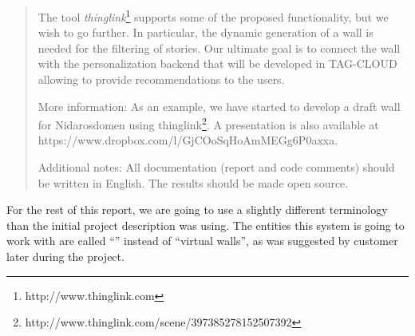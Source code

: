 \documentclass[11pt]{book}
\begin{document}
\begin{quotation}
The tool \emph{thinglink}\footnote{http://www.thinglink.com} supports some of the proposed functionality, but we wish to go further. In particular, the dynamic generation of a wall is needed for the filtering of stories. Our ultimate goal is to connect the wall with the personalization backend that will be developed in TAG-CLOUD allowing to provide recommendations to the users.

More information: As an example, we have started to develop a draft wall for Nidarosdomen using thinglink\footnote{http://www.thinglink.com/scene/397385278152507392}. A presentation is also available at https://www.dropbox.com/l/GjCOoSqHoAmMEGg6P0axxa.

Additional notes: All documentation (report and code comments) should be written in English. The results should be made open source.\cite[p. 47]{compendium}
\end{quotation}

For the rest of this report, we are going to use a slightly different terminology than the initial project description was using. The entities this system is going to work with are called ``\wallentityp'' instead of ``virtual walls'', as was suggested by customer later during the project.
\end{document}

